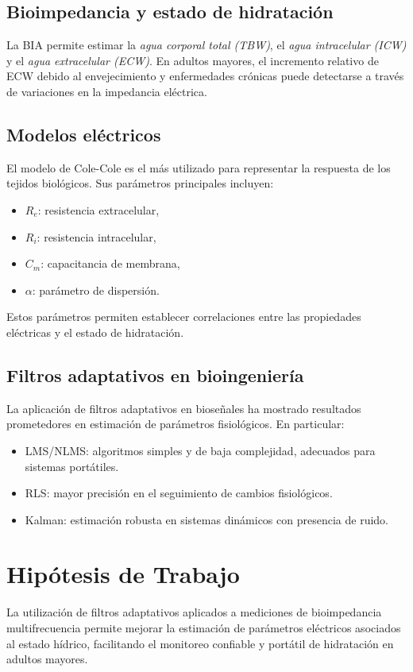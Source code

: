 \documentclass[12pt,a4paper]{article}
\begin{document}
\subsection{Bioimpedancia y estado de hidratación}
La BIA permite estimar la \textit{agua corporal total (TBW)}, el \textit{agua intracelular (ICW)} y el \textit{agua extracelular (ECW)}. En adultos mayores, el incremento relativo de ECW debido al envejecimiento y enfermedades crónicas puede detectarse a través de variaciones en la impedancia eléctrica.

\subsection{Modelos eléctricos}
El modelo de Cole-Cole es el más utilizado para representar la respuesta de los tejidos biológicos. Sus parámetros principales incluyen:
\begin{itemize}
    \item $R_e$: resistencia extracelular,
    \item $R_i$: resistencia intracelular,
    \item $C_m$: capacitancia de membrana,
    \item $\alpha$: parámetro de dispersión.
\end{itemize}
Estos parámetros permiten establecer correlaciones entre las propiedades eléctricas y el estado de hidratación.

\subsection{Filtros adaptativos en bioingeniería}
La aplicación de filtros adaptativos en bioseñales ha mostrado resultados prometedores en estimación de parámetros fisiológicos. En particular:
\begin{itemize}
    \item LMS/NLMS: algoritmos simples y de baja complejidad, adecuados para sistemas portátiles.
    \item RLS: mayor precisión en el seguimiento de cambios fisiológicos.
    \item Kalman: estimación robusta en sistemas dinámicos con presencia de ruido.
\end{itemize}

\section{Hipótesis de Trabajo}
La utilización de filtros adaptativos aplicados a mediciones de bioimpedancia multifrecuencia permite mejorar la estimación de parámetros eléctricos asociados al estado hídrico, facilitando el monitoreo confiable y portátil de hidratación en adultos mayores.
\end{document}
